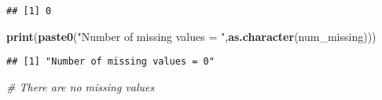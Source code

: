 \documentclass[
]{article}
\newenvironment{Shaded}{\begin{snugshade}}{\end{snugshade}}
\newcommand{\CommentTok}[1]{\textcolor[rgb]{0.56,0.35,0.01}{\textit{#1}}}
\newcommand{\DataTypeTok}[1]{\textcolor[rgb]{0.13,0.29,0.53}{#1}}
\newcommand{\KeywordTok}[1]{\textcolor[rgb]{0.13,0.29,0.53}{\textbf{#1}}}
\newcommand{\NormalTok}[1]{#1}
\newcommand{\OperatorTok}[1]{\textcolor[rgb]{0.81,0.36,0.00}{\textbf{#1}}}
\newcommand{\StringTok}[1]{\textcolor[rgb]{0.31,0.60,0.02}{#1}}
\begin{document}
\begin{Shaded}
\end{Shaded}

\begin{verbatim}
## [1] 0
\end{verbatim}

\begin{Shaded}
\begin{Highlighting}[]
\KeywordTok{print}\NormalTok{(}\KeywordTok{paste0}\NormalTok{(}\StringTok{"Number of missing values = "}\NormalTok{,}\KeywordTok{as.character}\NormalTok{(num_missing)))}
\end{Highlighting}
\end{Shaded}

\begin{verbatim}
## [1] "Number of missing values = 0"
\end{verbatim}

\begin{Shaded}
\begin{Highlighting}[]
\CommentTok{# There are no missing values}
\end{Highlighting}
\end{Shaded}
\end{document}
